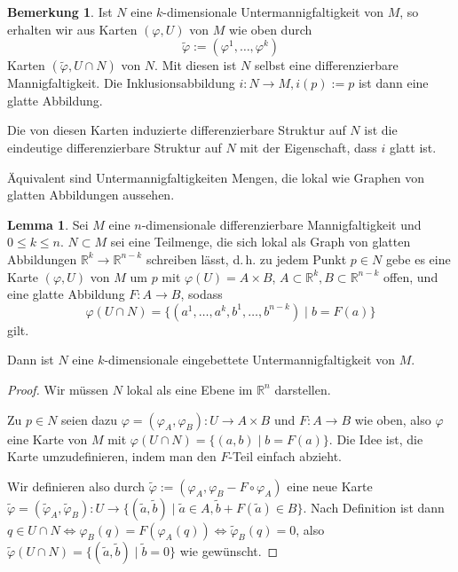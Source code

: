 \documentclass[a4paper]{scrbook}
\numberwithin{equation}{chapter}
\newcommand{\R}{\mathbb{R}}
\theoremstyle{definition}
\newtheorem{lemma}[defn]{Lemma}
\newtheorem{bem}[defn]{Bemerkung}
\begin{document}
\begin{bem}
	Ist $N$ eine $k$-dimensionale Untermannigfaltigkeit von $M$, so erhalten wir aus Karten $(\varphi,U)$ von $M$ wie oben durch
	\[\tilde\varphi := (\varphi^1, \dots, \varphi^k)\]
	Karten $(\tilde\varphi, U\cap N)$ von $N$. Mit diesen ist $N$ selbst eine differenzierbare Mannigfaltigkeit. Die Inklusionsabbildung $i\colon N \to M, i(p) := p$ ist dann eine glatte Abbildung.

	Die von diesen Karten induzierte differenzierbare Struktur auf $N$ ist die eindeutige differenzierbare Struktur auf $N$ mit der Eigenschaft, dass $i$ glatt ist.
\end{bem}

Äquivalent sind Untermannigfaltigkeiten Mengen, die lokal wie Graphen von glatten Abbildungen aussehen.
\begin{lemma} \label{lemma:umf_lokal_graph}
	Sei $M$ eine $n$-dimensionale differenzierbare Mannigfaltigkeit und $0 \le k \le n$. $N\subset M$ sei eine Teilmenge, die sich lokal als Graph von glatten Abbildungen $\R^k \to \R^{n-k}$ schreiben lässt, d.\,h. zu jedem Punkt $p\in N$ gebe es eine Karte $(\varphi,U)$ von $M$ um $p$ mit $\varphi(U) = A \times B$, $A \subset \R^k, B \subset \R^{n-k}$ offen, und eine glatte Abbildung $F\colon A \to B$, sodass
	\[\varphi(U\cap N) = \{(a^1,\dots,a^k, b^1, \dots, b^{n-k}) \mid b = F(a)\}\]
	gilt.

	Dann ist $N$ eine $k$-dimensionale eingebettete Untermannigfaltigkeit von $M$.

	\begin{proof}
		Wir müssen $N$ lokal als eine Ebene im $\R^n$ darstellen.

		Zu $p \in N$ seien dazu $\varphi = (\varphi_A,\varphi_B)\colon U \to A\times B$ und $F\colon A\to B$ wie oben, also $\varphi$ eine Karte von $M$ mit $\varphi(U\cap N) = \{(a,b) \mid b = F(a)\}$. Die Idee ist, die Karte umzudefinieren, indem man den $F$-Teil einfach abzieht.

		Wir definieren also durch $\tilde\varphi := (\varphi_A, \varphi_B - F\circ\varphi_A)$ eine neue Karte $\tilde\varphi = (\tilde\varphi_A, \tilde\varphi_B) \colon U \to \{(\tilde a,\tilde b) \mid \tilde a \in A, \tilde b + F(\tilde a) \in B\}$. Nach Definition ist dann $q \in U\cap N \iff \varphi_B(q) = F(\varphi_A(q)) \iff \tilde\varphi_B(q) = 0$, also $\tilde\varphi(U\cap N) = \{(\tilde a,\tilde b) \mid \tilde b = 0\}$ wie gewünscht.


\end{proof}
\end{lemma}
\end{document}
